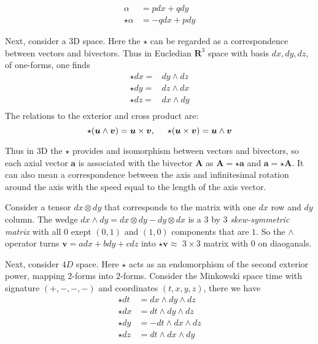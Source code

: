 \begin{align}
\alpha &= pdx +qdy \\
\star \alpha &= -q dx + p dy
\end{align}

Next, consider a 3D space. 
Here the $\star$ can be regarded as a correspondence between vectors and bivectors. 
Thus in Eucledian $\boldsymbol{R}^3$ space with basis $dx,dy,dz$, of one-forms, one finds
\begin{align}
\star dx =& dy\wedge dz \\
\star dy =& dz\wedge dx \\
\star dz =& dx \wedge dy \\
\end{align}
The relations to the exterior and cross product are:
\begin{equation}
\star(\boldsymbol{u}\wedge\boldsymbol{v})=\boldsymbol{u}\times\boldsymbol{v}, \hspace{5mm}\star(\boldsymbol{u}\times\boldsymbol{v}) = \boldsymbol{u}\wedge\boldsymbol{v}
\end{equation}

Thus in 3D the $\star$ provides and isomorphism between vectors and bivectors, so each axial vector $\boldsymbol{a}$ is associated with the bivector $\boldsymbol{A}$ as $\boldsymbol{A} = \star\boldsymbol{a}$ and $\boldsymbol{a} = \star\boldsymbol{A}$. It can also mean a correspondence between the axis and infinitesimal rotation around the axis with the speed equal to the length of the axis vector.

Consider a tensor $dx \otimes dy$ that corresponds to the matrix with one $dx$ row and $dy$ column. The wedge $dx\wedge dy = dx\otimes dy - dy\otimes dx$ is a 3 by 3 \textit{skew-symmetric matrix} with all $0$ exept $(0,1)$ and $(1,0)$ components that are $1$. 
So the $\wedge$ operator turns $\boldsymbol{v} = adx + bdy + cdz$ into $\star\boldsymbol{v}\approx$ $3\times 3$ matrix with $0$ on diaoganals.

Next, consider $4D$ space.
Here $\star$ acts as an endomorphism of the second exterior power, mapping $2$-forms into $2$-forms. 
Consider the Minkowski space time with signature $(+,-,-,-)$ and coordinates $(t,x,y,z)$, there we have
\begin{align}
\star dt &= dx \wedge dy \wedge dz \\
\star dx &= dt \wedge dy \wedge dz \\
\star dy &= -dt \wedge dx \wedge dz \\ 
\star dz &= dt \wedge dx \wedge dy 
\end{align}

